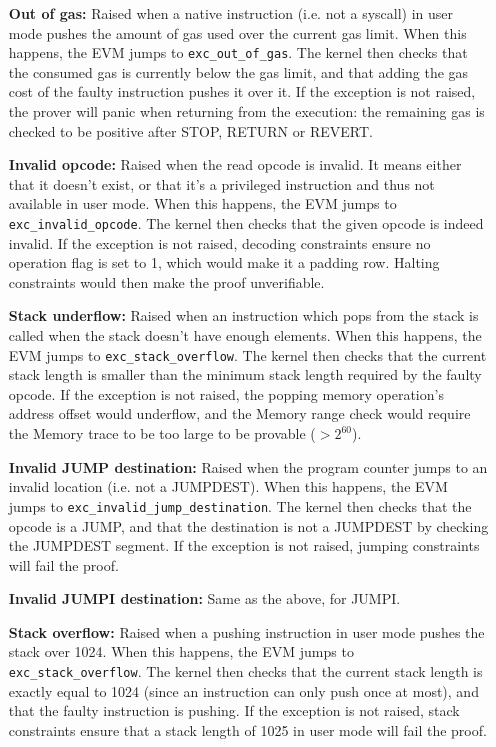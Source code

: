 \begin{enumerate}[align=left]
  \item[\textbf{Out of gas:}] Raised when a native instruction (i.e. not a syscall) in user mode pushes the amount of gas used over the current gas limit.
When this happens, the EVM jumps to \texttt{exc\_out\_of\_gas}. The kernel then checks that the consumed gas is currently below the gas limit,
and that adding the gas cost of the faulty instruction pushes it over it.
If the exception is not raised, the prover will panic when returning from the execution: the remaining gas is checked to be positive after STOP, RETURN or REVERT.
  \item[\textbf{Invalid opcode:}] Raised when the read opcode is invalid. It means either that it doesn't exist, or that it's a privileged instruction and
thus not available in user mode. When this happens, the EVM jumps to \texttt{exc\_invalid\_opcode}. The kernel then checks that the given opcode is indeed invalid.
If the exception is not raised, decoding constraints ensure no operation flag is set to 1, which would make it a padding row. Halting constraints would then make the proof
unverifiable.
  \item[\textbf{Stack underflow:}] Raised when an instruction which pops from the stack is called when the stack doesn't have enough elements.
When this happens, the EVM jumps to \texttt{exc\_stack\_overflow}. The kernel then checks that the current stack length is smaller than the minimum 
stack length required by the faulty opcode.
If the exception is not raised, the popping memory operation's address offset would underflow, and the Memory range check would require the Memory trace to be too
large to be provable ($>2^{60}$).
  \item[\textbf{Invalid JUMP destination:}] Raised when the program counter jumps to an invalid location (i.e. not a JUMPDEST). When this happens, the EVM jumps to
\texttt{exc\_invalid\_jump\_destination}. The kernel then checks that the opcode is a JUMP, and that the destination is not a JUMPDEST by checking the
JUMPDEST segment.
If the exception is not raised, jumping constraints will fail the proof.
  \item[\textbf{Invalid JUMPI destination:}] Same as the above, for JUMPI.
  \item[\textbf{Stack overflow:}] Raised when a pushing instruction in user mode pushes the stack over 1024. When this happens, the EVM jumps
to \texttt{exc\_stack\_overflow}. The kernel then checks that the current stack length is exactly equal to 1024 (since an instruction can only
push once at most), and that the faulty instruction is pushing.
If the exception is not raised, stack constraints ensure that a stack length of 1025 in user mode will fail the proof.
\end{enumerate}
